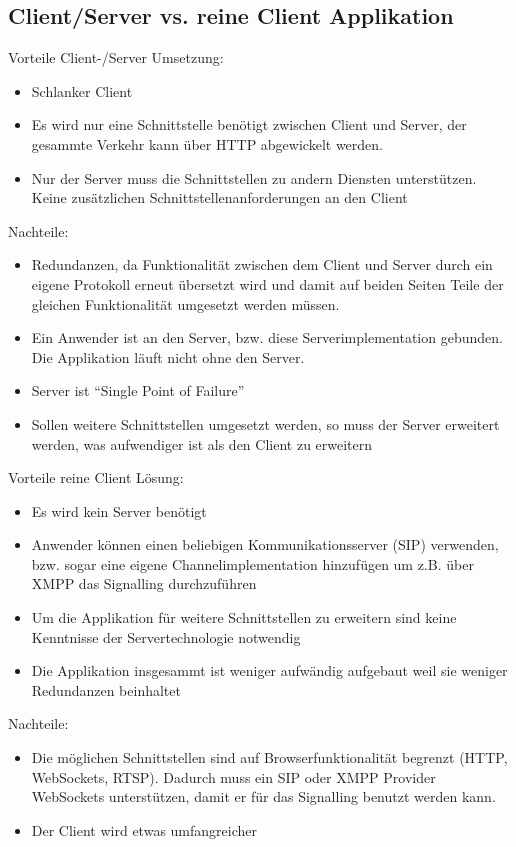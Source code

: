 	\subsection{Client/Server vs. reine Client Applikation}
		Vorteile Client-/Server Umsetzung:
		\begin{itemize}
			\item Schlanker Client
			\item Es wird nur eine Schnittstelle benötigt zwischen Client und Server, der gesammte Verkehr kann über HTTP abgewickelt werden.
			\item Nur der Server muss die Schnittstellen zu andern Diensten unterstützen. Keine zusätzlichen Schnittstellenanforderungen an den Client
		\end{itemize}
		Nachteile:
		\begin{itemize}
			\item Redundanzen, da Funktionalität zwischen dem Client und Server durch ein eigene Protokoll erneut übersetzt wird und damit auf beiden Seiten Teile der gleichen Funktionalität umgesetzt werden müssen.
			\item Ein Anwender ist an den Server, bzw. diese Serverimplementation gebunden. Die Applikation läuft nicht ohne den Server.
			\item Server ist ``Single Point of Failure''
			\item Sollen weitere Schnittstellen umgesetzt werden, so muss der Server erweitert werden, was aufwendiger ist als den Client zu erweitern
		\end{itemize}


		Vorteile reine Client Lösung:
		\begin{itemize}
			\item Es wird kein Server benötigt
			\item Anwender können einen beliebigen Kommunikationsserver (SIP) verwenden, bzw. sogar eine eigene Channelimplementation hinzufügen um z.B. über XMPP das Signalling durchzuführen
			\item Um die Applikation für weitere Schnittstellen zu erweitern sind keine Kenntnisse der Servertechnologie notwendig
			\item Die Applikation insgesammt ist weniger aufwändig aufgebaut weil sie weniger Redundanzen beinhaltet
		\end{itemize}
		Nachteile:
		\begin{itemize}
			\item Die möglichen Schnittstellen sind auf Browserfunktionalität begrenzt (HTTP, WebSockets, RTSP). Dadurch muss ein SIP oder XMPP Provider WebSockets unterstützen, damit er für das Signalling benutzt werden kann.
			\item Der Client wird etwas umfangreicher
		\end{itemize}


